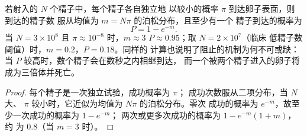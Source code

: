 \begin{theorem}[为什么一个卵子需要数百万个精子]\label{thm:b2:mammal-reproduction:poisson}
若射入的 $N$ 个精子中，每个精子各自独立地
以较小的概率 $\pi$ 到达卵子表面，则到达的精子数
服从均值为 $m = N\pi$ 的泊松分布，且至少有一个
精子到达的概率为
\[
P = 1 - e^{-m}.
\]
当 $N = 3\times 10^{8}$ 且 $\pi \approx 10^{-8}$ 时，$m \approx 3$
$P \approx 0.95$；取 $N = 2\times 10^{7}$（临床
低精子数阈值）时，$m = 0.2$，$P = 0.18$。同样的
计算也说明了阻止的机制为何不可或缺：当
$P$ 较高时，数个精子会在数秒之内相继到达，
而一个被两个精子进入的卵子将成为三倍体并死亡。
\end{theorem}
\begin{proof}
每个精子是一次独立试验，成功概率为 $\pi$；
成功次数服从二项分布，当 $N$ 大、
$\pi$ 较小时，它近似为均值为 $N\pi$ 的泊松分布。零次
成功的概率为 $e^{-m}$，故至少一次成功的概率为 $1 - e^{-m}$；
两次或更多次成功的概率为 $1 - e^{-m}(1 + m)$，约
为 $0.8$（当 $m = 3$ 时）。
\end{proof}

